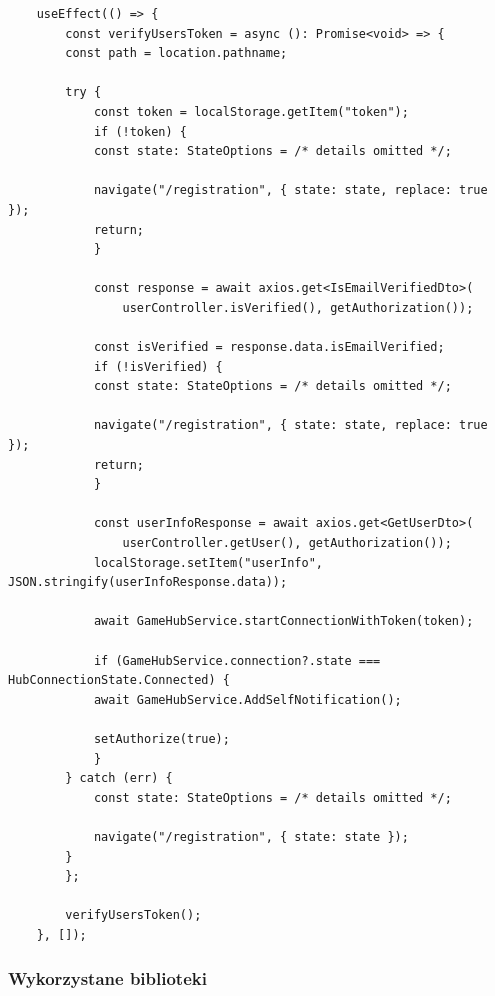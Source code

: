 \documentclass[12pt,a4paper]{article}
\begin{document}
\newpage

\begin{verbatim}
    useEffect(() => {
        const verifyUsersToken = async (): Promise<void> => {
        const path = location.pathname;

        try {
            const token = localStorage.getItem("token");
            if (!token) {
            const state: StateOptions = /* details omitted */;

            navigate("/registration", { state: state, replace: true });
            return;
            }

            const response = await axios.get<IsEmailVerifiedDto>(
                userController.isVerified(), getAuthorization());

            const isVerified = response.data.isEmailVerified;
            if (!isVerified) {
            const state: StateOptions = /* details omitted */;

            navigate("/registration", { state: state, replace: true });
            return;
            }

            const userInfoResponse = await axios.get<GetUserDto>(
                userController.getUser(), getAuthorization());
            localStorage.setItem("userInfo", JSON.stringify(userInfoResponse.data));

            await GameHubService.startConnectionWithToken(token);

            if (GameHubService.connection?.state === HubConnectionState.Connected) {
            await GameHubService.AddSelfNotification();

            setAuthorize(true);
            }
        } catch (err) {
            const state: StateOptions = /* details omitted */;

            navigate("/registration", { state: state });
        }
        };

        verifyUsersToken();
    }, []);
\end{verbatim}
            
\newpage
\subsubsection{Wykorzystane biblioteki}
\end{document}
